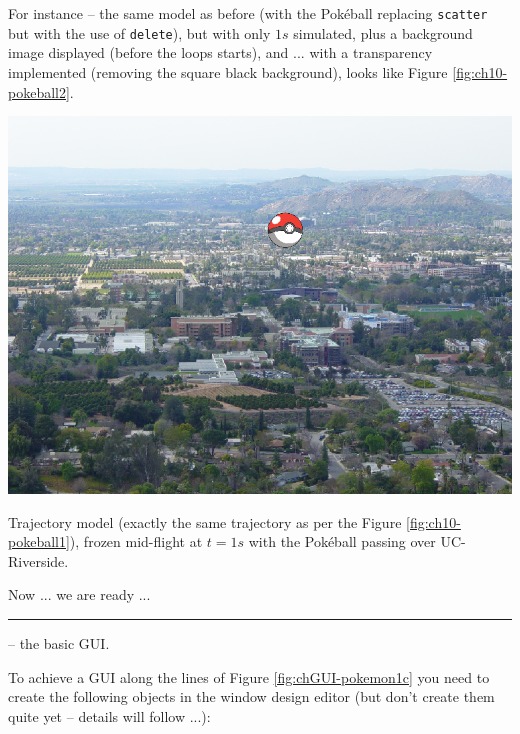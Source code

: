 \documentclass{tufte-book} %
\begin{document}
For instance -- the same model as before (with the Pok\'eball replacing \texttt{scatter} but with the use of \texttt{delete}), but with only \(1s\) simulated, plus a background image displayed (before the loops starts), and ... with a transparency implemented (removing the square black background), looks like Figure \ref{fig:ch10-pokeball2}.

\begin{marginfigure}[0.0in]
\includegraphics[width=\linewidth]{ch10-pokeball2.png}
\caption{Trajectory model (exactly the same trajectory as per the Figure \ref{fig:ch10-pokeball1}), frozen mid-flight at \(t=1s\) with the Pok\'eball passing over UC-Riverside.}
\label{fig:ch10-pokeball2}
\end{marginfigure}

Now ... we are ready ...

\vspace{1mm}
\noindent\rule{4cm}{0.5pt}
\vspace{-2mm}

 -- the basic GUI.

To achieve a GUI along the lines of Figure \ref{fig:chGUI-pokemon1c} you need to create the following objects in the window design editor (but don't create them quite yet -- details will follow ...):
\end{document}
